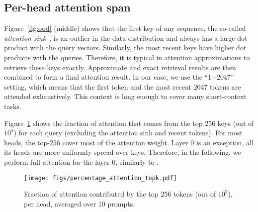 %
%
%
%

\subsection{Per-head attention span}
\label{sec:densepart}

Figure~\ref{fig:ood} (middle) shows that the first key of any sequence, the so-called \emph{attention sink}~\citep{xiao2024efficientstreaminglanguagemodels}, is an outlier in the data distribution and always has a large dot product with the query vectors. 
Similarly, the most recent keys have higher dot products with the queries. 
%
Therefore, it is typical in attention approximations to retrieve these keys exactly. 
Approximate and exact retrieval results are then combined to form a final attention result. 
In our case, we use the ``1+2047'' setting, which means that the first token and the most recent 2047 tokens are attended exhaustively. 
This context is long enough to cover many short-context tasks.

%
Figure~\ref{fig:attention_fraction} shows the fraction of attention that comes from the top 256 keys (out of $10^5$) for each query (excluding the attention sink and recent tokens). 
%
For most heads, the top-256 cover most of the attention weight. 
Layer 0 is an exception, all its heads are more uniformly spread over keys. 
Therefore, in the following, we perform full attention for the layer 0, similarly to \citet{tang2024quest,xiao2024efficientstreaminglanguagemodels}. 


%
%

\begin{figure}
    \centering
    \texttt{[image: figs/percentage\_attention\_topk.pdf]}
    \vspace{-2em}
    \caption{Fraction of attention contributed by the top 256 tokens (out of $10^5$), per head, averaged over 10 prompts. 
    \label{fig:attention_fraction}}
\end{figure}


%

%


%

%

%

%


%


%

%


%
